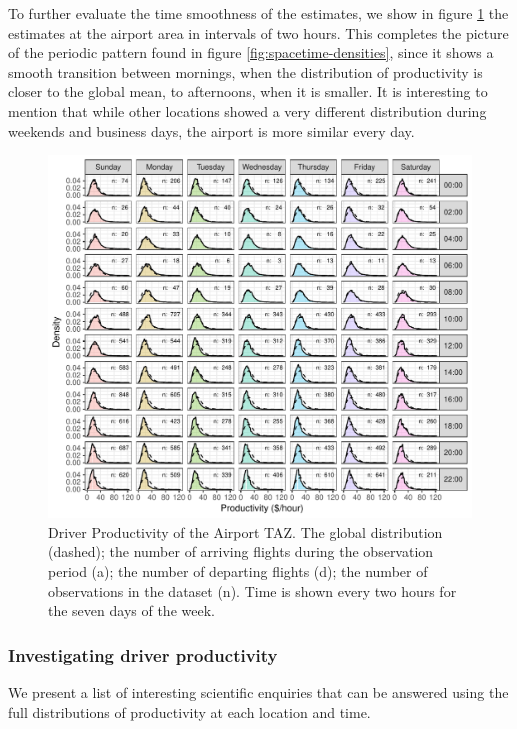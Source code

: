 \documentclass[11pt]{article}
\begin{document}
To further evaluate the time smoothness of the estimates, we show in figure \ref{fig:airport-densities} the estimates at the airport area in intervals of two hours. This completes the picture of the periodic pattern found in figure \ref{fig:spacetime-densities}, since it shows a smooth transition between mornings, when the distribution of productivity is closer to the global mean, to afternoons, when it is smaller. It is interesting to mention that while other locations showed a very different distribution during weekends and business days, the airport is more similar every day.



\begin{figure}[htb]
    \centering
    \includegraphics[width=0.98\linewidth]{img/densities_airport.pdf}
    \caption{Driver Productivity of the Airport TAZ. The global distribution (dashed); the number of arriving flights during the observation period (a); the number of departing flights (d); the number of observations in the dataset (n). Time is shown every two hours for the seven days of the week.}
    \label{fig:airport-densities}
\end{figure}


\subsubsection{Investigating driver productivity}

 We present a list of interesting scientific enquiries that can be answered using the full distributions of productivity at each location and time. 
 
\end{document}
